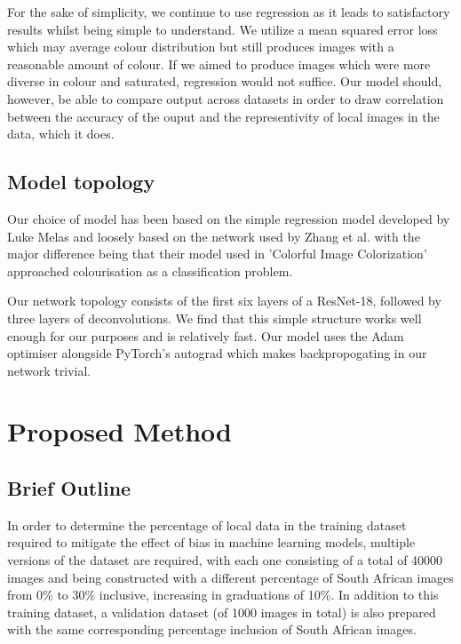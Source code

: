 \documentclass[conference]{IEEEtran}
\begin{document}
For the sake of simplicity, we continue to use regression as it leads to satisfactory results whilst being simple to understand. We utilize a mean squared error loss which may average colour distribution but still produces images with a reasonable amount of colour. If we aimed to produce images which were more diverse in colour and saturated, regression would not suffice. Our model should, however, be able to compare output across datasets in order to draw correlation between the accuracy of the ouput and the representivity of local images in the data, which it does.

\subsection{Model topology}

Our choice of model has been based on the simple regression model developed by Luke Melas \cite{melas2018mark} and loosely based on the network used by Zhang et al. \cite{zhang2016colorful}\cite{zhang2017real} with the major difference being that their model used in 'Colorful Image Colorization'\cite{zhang2016colorful} approached colourisation as a classification problem.

Our network topology consists of the first six layers of a ResNet-18, followed by three layers of deconvolutions. We find that this simple structure works well enough for our purposes and is relatively fast. Our model uses the Adam optimiser alongside PyTorch's autograd which makes backpropogating in our network trivial.

\section{Proposed Method}


\subsection{Brief Outline}

In order to determine the percentage of local data in the training dataset required to mitigate the effect of bias in machine learning models, multiple versions of the dataset are required, with each one consisting of a total of 40000 images and being constructed with a different percentage of South African images from 0\% to 30\% inclusive, increasing in graduations of 10\%. In addition to this training dataset, a validation dataset (of 1000 images in total) is also prepared with the same corresponding percentage inclusion of South African images.
\end{document}
